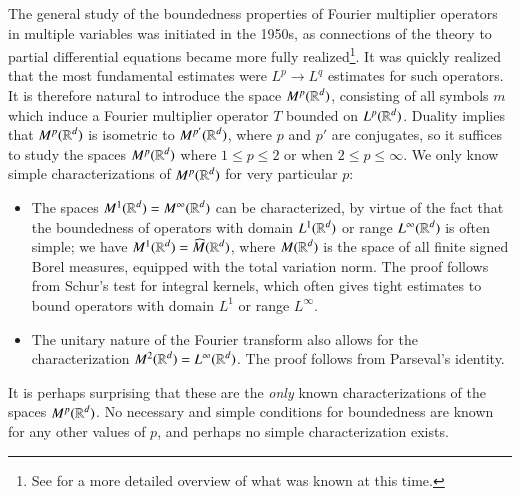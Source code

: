 The general study of the boundedness properties of Fourier multiplier operators in multiple variables was initiated in the 1950s, as connections of the theory to partial differential equations became more fully realized\footnote{See \cite{Hormander1} for a more detailed overview of what was known at this time.}. It was quickly realized that the most fundamental estimates were $L^p \to L^q$ estimates for such operators.
%
%
%
It is therefore natural to introduce the space $M^p(\operatorname{\mathbb{R}}^d)$, consisting of all symbols $m$ which induce a Fourier multiplier operator $T$ bounded on $L^p(\operatorname{\mathbb{R}}^d)$. Duality implies that $M^p(\operatorname{\mathbb{R}}^d)$ is isometric to $M^{p'}(\operatorname{\mathbb{R}}^d)$, where $p$ and $p'$ are conjugates, so it suffices to study the spaces $M^p(\operatorname{\mathbb{R}}^d)$ where $1 \leq p \leq 2$ or when $2 \leq p \leq \infty$. We only know simple characterizations of $M^p(\operatorname{\mathbb{R}}^d)$ for very particular $p$:
%
\begin{itemize}
    \item The spaces $M^1(\operatorname{\mathbb{R}}^d) = M^\infty(\operatorname{\mathbb{R}}^d)$ can be characterized, by virtue of the fact that the boundedness of operators with domain $L^1(\operatorname{\mathbb{R}}^d)$ or range $L^\infty(\operatorname{\mathbb{R}}^d)$ is often simple; we have $M^1(\operatorname{\mathbb{R}}^d) = \widehat{M}(\operatorname{\mathbb{R}}^d)$, where  $M(\operatorname{\mathbb{R}}^d)$ is the space of all finite signed Borel measures, equipped with the total variation norm. The proof follows from Schur's test for integral kernels, which often gives tight estimates to bound operators with domain $L^1$ or range $L^\infty$.

    \item The unitary nature of the Fourier transform also allows for the characterization $M^2(\operatorname{\mathbb{R}}^d) = L^\infty(\operatorname{\mathbb{R}}^d)$. The proof follows from Parseval's identity.
\end{itemize}
%
It is perhaps surprising that these are the \emph{only} known characterizations of the spaces $M^p(\operatorname{\mathbb{R}}^d)$. No necessary and simple conditions for boundedness are known for any other values of $p$, and perhaps no simple characterization exists.

